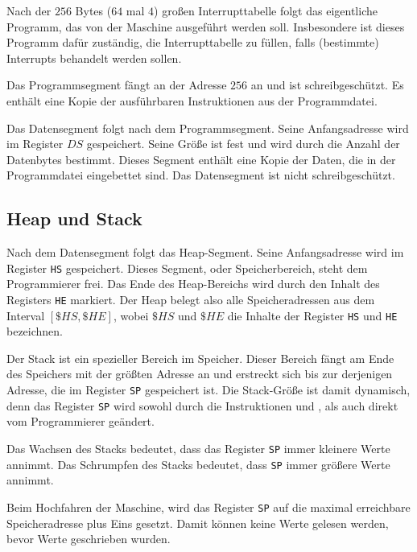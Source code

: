 Nach der $256$ Bytes ($64$ mal $4$) großen Interrupttabelle
folgt das eigentliche Programm, das von der Maschine ausgeführt werden soll.
Insbesondere ist dieses Programm dafür zuständig, die Interrupttabelle zu
füllen, falls (bestimmte) Interrupts behandelt werden sollen.


Das Programmsegment fängt an der Adresse $256$ an und ist
schreibgeschützt. Es enthält eine Kopie der ausführbaren Instruktionen aus
der Programmdatei.

Das Datensegment folgt nach dem Programmsegment. Seine
Anfangsadresse wird im Register $DS$ gespeichert. Seine
Größe ist fest und wird durch die Anzahl der Datenbytes bestimmt. Dieses Segment
enthält eine Kopie der Daten, die in der Programmdatei eingebettet sind.
Das Datensegment ist nicht schreibgeschützt.

\subsection{Heap und Stack}
\label{subsec:Stack}

Nach dem Datensegment folgt das Heap-Segment. Seine Anfangsadresse
wird im Register \texttt{HS} gespeichert. Dieses Segment,
oder Speicherbereich, steht dem Programmierer frei. Das Ende des Heap-Bereichs
wird durch den Inhalt des Registers \texttt{HE} markiert.
Der Heap belegt also alle Speicheradressen aus dem Interval $[\$HS, \$HE]$,
wobei $\$HS$ und $\$HE$ die Inhalte der Register \texttt{HS} und \texttt{HE}
bezeichnen.


Der Stack ist ein spezieller Bereich im Speicher. Dieser Bereich fängt am Ende
des Speichers mit der größten Adresse an und erstreckt sich bis zur derjenigen
Adresse, die im Register \texttt{SP} gespeichert ist. Die
Stack-Größe ist damit dynamisch, denn das Register \texttt{SP} wird sowohl durch
die Instruktionen  und , als auch direkt vom
Programmierer geändert.

Das Wachsen des Stacks bedeutet, dass das Register
\texttt{SP} immer kleinere Werte annimmt. Das Schrumpfen
des Stacks bedeutet, dass \texttt{SP} immer größere Werte annimmt.

Beim Hochfahren der Maschine, wird das Register \texttt{SP} auf die
maximal erreichbare Speicheradresse plus Eins gesetzt. Damit können keine Werte
gelesen werden, bevor Werte geschrieben wurden.



